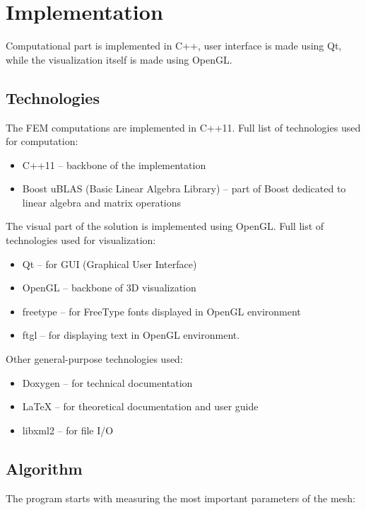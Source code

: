 \documentclass[a4paper,12pt]{article}
\begin{document}
\section{Implementation}

Computational part is implemented in C++, user interface is made using Qt, while the visualization itself is made using
OpenGL.

\subsection{Technologies}

The FEM computations are implemented in C++11. Full list of technologies used for computation:

\begin{itemize}
  \item C++11 -- backbone of the implementation
  \item Boost uBLAS (Basic Linear Algebra Library) -- part of Boost dedicated to linear algebra and matrix operations
\end{itemize}

The visual part of the solution is implemented using OpenGL. Full list of technologies used for visualization:

\begin{itemize}
  \item Qt -- for GUI (Graphical User Interface)
  \item OpenGL -- backbone of 3D visualization
  \item freetype -- for FreeType fonts displayed in OpenGL environment
  \item ftgl -- for displaying text in OpenGL environment.
\end{itemize}

Other general-purpose technologies used:

\begin{itemize}
  \item Doxygen -- for technical documentation
  \item LaTeX -- for theoretical documentation and user guide
  \item libxml2 -- for file I/O
\end{itemize}

\subsection{Algorithm}

The program starts with measuring the most important parameters of the mesh:
\end{document}
